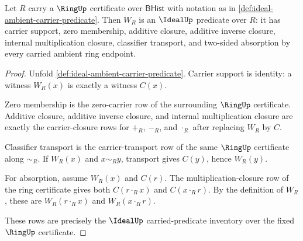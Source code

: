 \begin{theorem}
\label{thm:ideal-ambient-carrier-ideal-closure}
Let $R$ carry a $\RingUp$ certificate over $\mathsf{BHist}$ with notation as in
\autoref{def:ideal-ambient-carrier-predicate}. Then $W_R$ is an $\IdealUp$
predicate over $R$: it has carrier support, zero membership, additive closure,
additive inverse closure, internal multiplication closure, classifier
transport, and two-sided absorption by every carried ambient ring endpoint.
\end{theorem}
\begin{proof}
Unfold \autoref{def:ideal-ambient-carrier-predicate}. Carrier support is
identity: a witness $W_R(x)$ is exactly a witness $C(x)$.

Zero membership is the zero-carrier row of the surrounding $\RingUp$
certificate. Additive closure, additive inverse closure, and internal
multiplication closure are exactly the carrier-closure rows for $+_R$, $-_R$,
and $\cdot_R$ after replacing $W_R$ by $C$.

Classifier transport is the carrier-transport row of the same $\RingUp$
certificate along $\sim_R$. If $W_R(x)$ and $x\sim_R y$, transport gives
$C(y)$, hence $W_R(y)$.

For absorption, assume $W_R(x)$ and $C(r)$. The multiplication-closure row of
the ring certificate gives both $C(r\cdot_R x)$ and $C(x\cdot_R r)$. By the
definition of $W_R$, these are $W_R(r\cdot_R x)$ and $W_R(x\cdot_R r)$.

These rows are precisely the $\IdealUp$ carried-predicate inventory over the
fixed $\RingUp$ certificate.
\end{proof}

